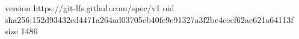 version https://git-lfs.github.com/spec/v1
oid sha256:152d93432cd4471a264ad03705cb40fe9c91327a3f2bc4eecf62ae621a64113f
size 1486
